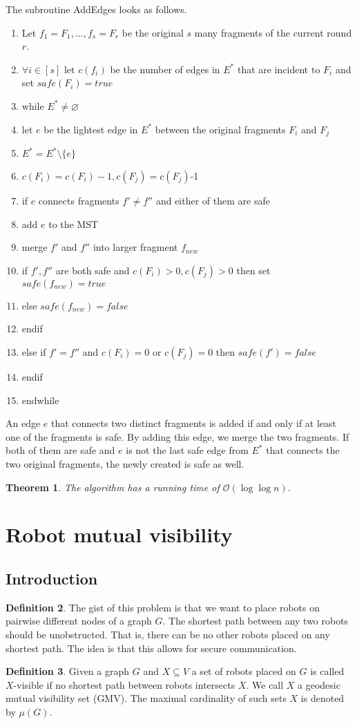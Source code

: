 \documentclass[a4paper, 12pt]{article}
\theoremstyle{plain}
\newtheorem{theorem}{Theorem}[section] %
\theoremstyle{definition}
\newtheorem{definition}[theorem]{Definition} %
\theoremstyle{lemma}
\theoremstyle{remark}
\theoremstyle{corollary}
\theoremstyle{example}
\begin{document}
	The subroutine AddEdges looks as follows.
	\begin{enumerate}
		\item Let $f_1=F_1,...,f_s=F_r$ be the original $s$ many fragments of the current round $r$.
		\item $\forall i \in [s]$ let $c(f_i)$ be the number of edges in $E^*$ that are incident to $F_i$ and set $safe(F_i) = true$
		\item while $E^* \neq \varnothing$
		\item let $e$ be the lightest edge in $E^*$ between the original fragments $F_i$ and $F_j$
		\item $E^* = E^* \setminus \{e\}$
		\item $c(F_i) = c(F_i)-1, c(F_j) = c(F_j)$-1
		\item if $e$ connects fragments $f'\neq f''$ and either of them are safe
		\item add $e$ to the MST
		\item merge $f'$ and $f''$ into larger fragment $f_{new}$
		\item if $f',f''$ are both safe and $c(F_i)>0,c(F_j)>0$ then set $safe(f_{new}) = true$
		\item else $safe(f_{new})=false$
		\item endif
		\item else if $f'=f''$ and $c(F_i)=0$ or $c(F_j)=0$ then $safe(f')=false$
		\item endif
		\item endwhile 
	\end{enumerate}
	An edge $e$ that connects two distinct fragments is added if and only if at least one of the fragments is safe. By adding this edge, we merge the two fragments. If both of them are safe and $e$ is not the last safe edge from $E^*$ that connects the two original fragments, the newly created is safe as well.
	\begin{theorem}
		The algorithm has a running time of $\mathcal{O}(\log \log n)$.
	\end{theorem}
\section{Robot mutual visibility}
	\subsection{Introduction}
	\begin{definition}
		The gist of this problem is that we want to place robots on pairwise different nodes of a graph $G$. The shortest path between any two robots should be unobstructed. That is, there can be no other robots placed on any shortest path. The idea is that this allows for secure communication.
	\end{definition}
	\begin{definition}
		Given a graph $G$ and $X \subseteq V$ a set of robots placed on $G$ is called $X$-visible if no shortest path between robots intersects $X$. We call $X$ a geodesic mutual visibility set (GMV). The maximal cardinality of such sets $X$ is denoted by $\mu(G)$.
	\end{definition}
\end{document}

